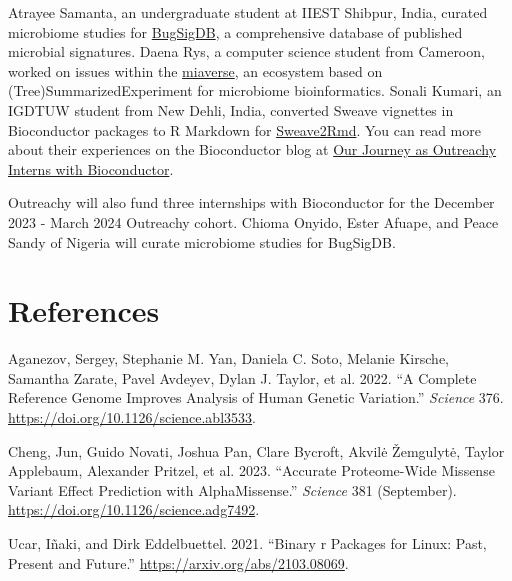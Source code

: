 Atrayee Samanta, an undergraduate student at IIEST Shibpur, India, curated microbiome studies for \href{https://bugsigdb.org/}{BugSigDB}, a comprehensive database of published microbial signatures. Daena Rys, a computer science student from Cameroon, worked on issues within the \href{https://microbiome.github.io/}{miaverse}, an ecosystem based on (Tree)SummarizedExperiment for microbiome bioinformatics. Sonali Kumari, an IGDTUW student from New Dehli, India, converted Sweave vignettes in Bioconductor packages to R Markdown for \href{https://bioconductor.github.io/sweave2rmd/}{Sweave2Rmd}. You can read more about their experiences on the Bioconductor blog at \href{https://blog.bioconductor.org/posts/2023-07-14-OutreachyInternshipExperience/}{Our Journey as Outreachy Interns with Bioconductor}.

Outreachy will also fund three internships with Bioconductor for the December 2023 - March 2024 Outreachy cohort. Chioma Onyido, Ester Afuape, and Peace Sandy of Nigeria will curate microbiome studies for BugSigDB.

\hypertarget{references}{%
\section*{References}\label{references}}

\hypertarget{refs}{}
\begin{CSLReferences}{1}{0}
\leavevmode{}%
Aganezov, Sergey, Stephanie M. Yan, Daniela C. Soto, Melanie Kirsche, Samantha Zarate, Pavel Avdeyev, Dylan J. Taylor, et al. 2022. {``A Complete Reference Genome Improves Analysis of Human Genetic Variation.''} \emph{Science} 376. \url{https://doi.org/10.1126/science.abl3533}.

\leavevmode{}%
Cheng, Jun, Guido Novati, Joshua Pan, Clare Bycroft, Akvilė Žemgulytė, Taylor Applebaum, Alexander Pritzel, et al. 2023. {``Accurate Proteome-Wide Missense Variant Effect Prediction with AlphaMissense.''} \emph{Science} 381 (September). \url{https://doi.org/10.1126/science.adg7492}.

\leavevmode{}%
Ucar, Iñaki, and Dirk Eddelbuettel. 2021. {``Binary r Packages for Linux: Past, Present and Future.''} \url{https://arxiv.org/abs/2103.08069}.

\end{CSLReferences}


\address{%
Bioconductor Core Developers\\
\\%
Massachusetts, New York, Seattle\\
%
%
%
\href{mailto:bioconductorcoreteam@gmail.com}{\nolinkurl{bioconductorcoreteam@gmail.com}}%
}
